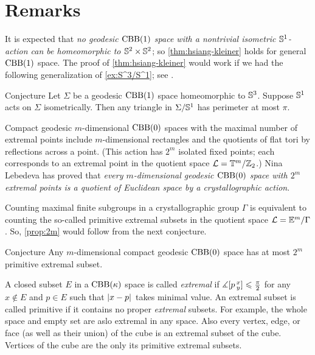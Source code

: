\section{Remarks}

It is expected that \textit{no geodesic $\mathrm{CBB}(1)$ space with a nontrivial isometric $\mathbb{S}^1$-action can be homeomorphic to $\mathbb{S}^2\times\mathbb{S}^2$};
so \ref{thm:hsiang-kleiner} holds for general $\mathrm{CBB}(1)$ space.
The proof of \ref{thm:hsiang-kleiner} would work if we had the following generalization of \ref{ex:S^3/S^1};
see \cite{harvey-searle}.

\begin{thm}{Conjecture}
Let $\Sigma$ be a geodesic $\mathrm{CBB}(1)$ space homeomorphic to $\mathbb{S}^3$.
Suppose $\mathbb{S}^1$ acts on $\Sigma$ isometrically.
Then any triangle in $\Sigma/\mathbb{S}^1$ has perimeter at most $\pi$.
\end{thm}


Compact geodesic $m$-dimensional $\mathrm{CBB}(0)$ spaces with the maximal number of extremal points include $m$-dimensional rectangles and the quotients of flat tori by reflections across a point.
(This action has $2^m$ isolated fixed points; each corresponds to an extremal point in the quotient space $\mathcal{L}=\mathbb{T}^m/\mathbb{Z}_2$.)
Nina Lebedeva has proved \cite{lebedeva} that \textit{every $m$-dimensional geodesic $\mathrm{CBB}(0)$ space with $2^m$ extremal points is a quotient of Euclidean space by a crystallographic action}.

Counting maximal finite subgroups in a crystallographic group $\Gamma$ is equivalent to counting the so-called primitive extremal subsets in the quotient space $\mathcal{L}=\mathbb{E}^m/\Gamma$.
So, \ref{prop:2m} would follow from the next conjecture.

\begin{thm}{Conjecture}
Any $m$-dimensional compact geodesic $\mathrm{CBB}(0)$ space has at most $2^m$ primitive extremal subset.
\end{thm}

A closed subset $E$ in a $\mathrm{CBB}(\kappa)$ space is called 
\emph{extremal} if $\mangle\hinge pxy\z\le \tfrac\pi2$ for any $x\notin E$ and $p\in E$ such that $\dist{x}{p}{}$ takes minimal value.
An extremal subset is called primitive if it contains no proper \emph{extremal} subsets.
For example, the whole space and empty set are aslo extremal in any space.
Also every vertex, edge, or face (as well as their union) of the cube is an extremal subset of the cube.
Vertices of the cube are the only its primitive extremal subsets.

